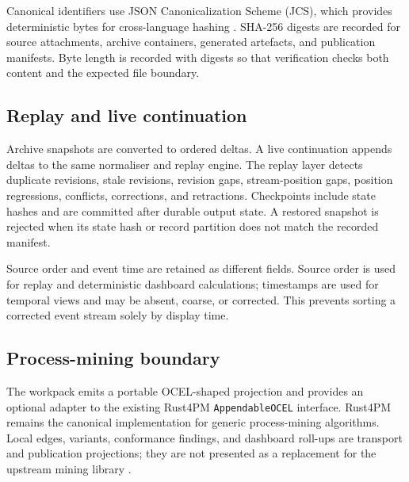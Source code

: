 \documentclass[11pt]{article}
\begin{document}
Canonical identifiers use JSON Canonicalization Scheme (JCS), which provides deterministic bytes
for cross-language hashing \cite{rfc8785}. SHA-256 digests are recorded for source attachments,
archive containers, generated artefacts, and publication manifests. Byte length is recorded with
digests so that verification checks both content and the expected file boundary.

\subsection{Replay and live continuation}
Archive snapshots are converted to ordered deltas. A live continuation appends deltas to the same
normaliser and replay engine. The replay layer detects duplicate revisions, stale revisions,
revision gaps, stream-position gaps, position regressions, conflicts, corrections, and
retractions. Checkpoints include state hashes and are committed after durable output state. A
restored snapshot is rejected when its state hash or record partition does not match the recorded
manifest.

Source order and event time are retained as different fields. Source order is used for replay and
deterministic dashboard calculations; timestamps are used for temporal views and may be absent,
coarse, or corrected. This prevents sorting a corrected event stream solely by display time.

\subsection{Process-mining boundary}
The workpack emits a portable OCEL-shaped projection and provides an optional adapter to the
existing Rust4PM \texttt{AppendableOCEL} interface. Rust4PM remains the canonical implementation
for generic process-mining algorithms. Local edges, variants, conformance findings, and dashboard
roll-ups are transport and publication projections; they are not presented as a replacement for
the upstream mining library \cite{ocel2,rust4pm}.
\end{document}
